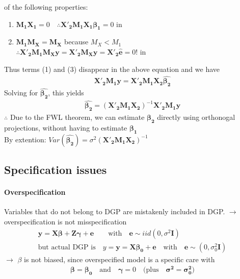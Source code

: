  of the following properties:
\begin{enumerate}[(1)]
\item $\boldsymbol{M_{1}X_{1}}=0\quad\therefore \boldsymbol{X'_{2}M_{1}X_{1}\beta_{1}}=0$ in 
\item $\boldsymbol{M_{1}M_{X}}=\boldsymbol{M_{X}}$ because $M_{X}<M_{1}$\\
$\therefore \boldsymbol{X'_{2}M_{1}M_{X}y}=\boldsymbol{X'_{2}M_{X}y}=\boldsymbol{X'_{2}\hat{e}}=0!$ in 
\end{enumerate}
Thus terms (1) and (3) disappear in the above equation and we have
\begin{eqnarray*}
\boldsymbol{X'_{2}M_{1}y} = \boldsymbol{X'_{2}M_{1}X_{2}\hat{\beta_{2}}}
\end{eqnarray*}
Solving for $\boldsymbol{\hat{\beta_{2}}}$, this yields
\begin{eqnarray*}
\boldsymbol{\hat{\beta_{2}}}=(\boldsymbol{X'_{2}M_{1}X_{2}})^{-1}\boldsymbol{X'_{2}M_{1}y}
\end{eqnarray*}
$\therefore$ Due to the FWL theorem, we can estimate $\boldsymbol{\beta_{2}}$ directly using orthonogal projections, without having to estimate $\boldsymbol{\beta_{1}}$\\
By extention: $Var(\boldsymbol{\hat{\beta_{2}}})=\sigma^{2}(\boldsymbol{X'_{2}M_{1}X_{2}})^{-1}$

\subsection{Specification issues}
\paragraph{Overspecification} Variables that do not belong to DGP are mistakenly included in DGP.
$\to$ overspecification is not misspecification
\begin{eqnarray*}
\boldsymbol{y}=\boldsymbol{X\beta}+\boldsymbol{Z\gamma}+\boldsymbol{e}\qquad\text{with}\quad \boldsymbol{e}\sim iid(0,\sigma^{2}\boldsymbol{I})\\
\text{but actual DGP is}\quad y=\boldsymbol{y}=\boldsymbol{X\beta_{0}}+\boldsymbol{e}\quad \text{with}\quad \boldsymbol{e}\sim(0,\sigma_{0}^{2}\boldsymbol{I})
\end{eqnarray*}
$\to$ $\beta$ is not biased, since overspecified model is a specific care with
\begin{eqnarray*}
\boldsymbol{\beta}=\boldsymbol{\beta_{0}}\quad\text{and}\quad\boldsymbol{\gamma}=0\quad\text{(plus}\quad\boldsymbol{\sigma^{2}}=\boldsymbol{\sigma_{0}^{2}}\text{)}
\end{eqnarray*}
